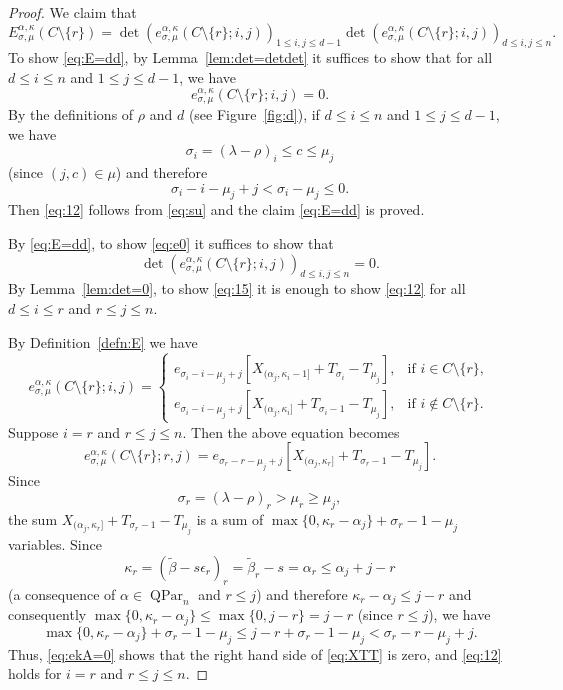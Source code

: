 \documentclass[12pt]{amsart}
\numberwithin{equation}{section}
\theoremstyle{definition}
\newcommand\wb{\widetilde{\beta}}
\newcommand\QPar{\operatorname{QPar}}
\begin{document}
\begin{proof}
 We claim that
\begin{equation}\label{eq:E=dd}
  E_{\sigma,\mu}^{\alpha,\kappa}(C\setminus\{r\})
  =  \det(e_{\sigma,\mu}^{\alpha,\kappa}(C\setminus\{r\};i,j))_{1\le i,j\le d-1}
  \det(e_{\sigma,\mu}^{\alpha,\kappa}(C\setminus\{r\};i,j))_{d\le i,j\le n}.
\end{equation}
To show \eqref{eq:E=dd}, by Lemma~\ref{lem:det=detdet} it suffices to show that
for all $d\le i\le n$ and $1\le j\le d-1$, we have
\begin{equation}
  \label{eq:12}
 e_{\sigma,\mu}^{\alpha,\kappa}(C\setminus\{r\};i,j) = 0.
\end{equation}
By the definitions of $\rho$ and $d$ (see Figure~\ref{fig:d}), if $d\le i\le n$
and $1\le j\le d-1$, we have
\[
\sigma_i=(\lambda-\rho)_i \le c \le \mu_j
\]
(since $(j, c) \in \mu$)
 and therefore
\begin{equation}\label{eq:su}
 \sigma_i-i-\mu_j+j < \sigma_i-\mu_j \le 0.
\end{equation}
Then \eqref{eq:12} follows from \eqref{eq:su} and the claim \eqref{eq:E=dd} is proved.


By \eqref{eq:E=dd}, to show \eqref{eq:e0} it suffices to show that
\begin{equation}
  \label{eq:15}
\det(e_{\sigma,\mu}^{\alpha,\kappa}(C\setminus\{r\};i,j))_{d\le i,j\le n} = 0.
\end{equation}
By Lemma~\ref{lem:det=0}, to show \eqref{eq:15} it is enough to show
\eqref{eq:12} for all $d\le i\le r$ and $r\le j\le n$.

By Definition~\ref{defn:E} we have
    \[
      e^{\alpha,\kappa}_{\sigma,\mu}(C\setminus\{r\};i,j)=
      \begin{cases}
      e_{\sigma_i-i-\mu_j+j}[X_{(\alpha_j,\kappa_i-1]} +
      T_{\sigma_i}-T_{\mu_j}],
      & \mbox{if $i\in C\setminus\{r\}$},\\
      e_{\sigma_i-i-\mu_j+j}[X_{(\alpha_j,\kappa_i]} +
      T_{\sigma_i-1}-T_{\mu_j}],
      & \mbox{if $i\not\in C\setminus\{r\}$}.
      \end{cases}
  \]
Suppose $i=r$ and $r\le j\le n$. Then the above equation becomes
  \begin{equation}\label{eq:XTT}
    e^{\alpha,\kappa}_{\sigma,\mu}(C\setminus\{r\};r,j)
    =e_{\sigma_r-r-\mu_j+j}[X_{(\alpha_j,\kappa_r]} + T_{\sigma_r-1}-T_{\mu_j}].
  \end{equation}
  Since
  \[
\sigma_r=(\lambda-\rho)_r>\mu_r\ge\mu_j,
\]
the sum
$X_{(\alpha_j,\kappa_r]} + T_{\sigma_r-1}-T_{\mu_j}$ is a sum of
$\max\{0,\kappa_r-\alpha_j\} +\sigma_r-1-\mu_j$ variables. Since
\[
\kappa_r = (\wb-s\epsilon_r)_r = \wb_r-s = \alpha_r \le \alpha_j + j-r
\]
(a consequence of $\alpha \in \QPar_n$ and $r \le j$)
and therefore $\kappa_r-\alpha_j \le j-r$
and consequently $\max\{0,\kappa_r-\alpha_j\}
\le \max\{0,j-r\} = j-r$ (since $r\le j$), we have
\[
\max\{0,\kappa_r-\alpha_j\} +\sigma_r-1-\mu_j
\le j-r+\sigma_r-1-\mu_j < \sigma_r-r-\mu_j+j.
\]
Thus, \eqref{eq:ekA=0} shows that
the right hand side of \eqref{eq:XTT} is zero, and
\eqref{eq:12} holds for $i = r$ and $r\le j\le n$.


\end{proof}
\end{document}
